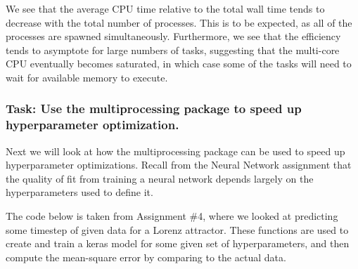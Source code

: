 \documentclass[11pt]{article}
\begin{document}
    We see that the average CPU time relative to the total wall time tends
to decrease with the total number of processes. This is to be expected,
as all of the processes are spawned simultaneously. Furthermore, we see
that the efficiency tends to asymptote for large numbers of tasks,
suggesting that the multi-core CPU eventually becomes saturated, in
which case some of the tasks will need to wait for available memory to
execute.

    \hypertarget{task-use-the-multiprocessing-package-to-speed-up-hyperparameter-optimization.}{%
\subsubsection{Task: Use the multiprocessing package to speed up
hyperparameter
optimization.}\label{task-use-the-multiprocessing-package-to-speed-up-hyperparameter-optimization.}}

    Next we will look at how the multiprocessing package can be used to
speed up hyperparameter optimizations. Recall from the Neural Network
assignment that the quality of fit from training a neural network
depends largely on the hyperparameters used to define it.

The code below is taken from Assignment \#4, where we looked at
predicting some timestep of given data for a Lorenz attractor. These
functions are used to create and train a keras model for some given set
of hyperparameters, and then compute the mean-square error by comparing
to the actual data.
\end{document}
